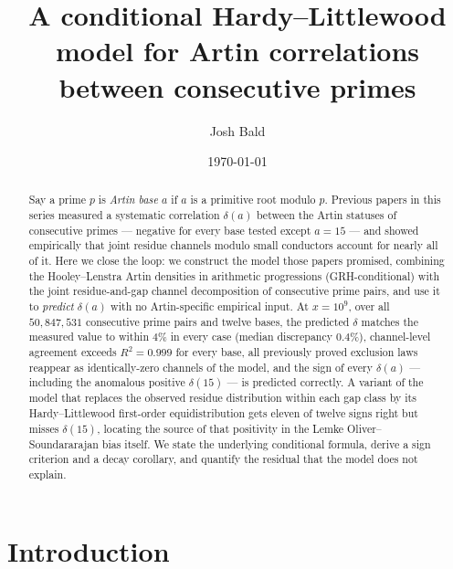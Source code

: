 \documentclass[11pt,reqno]{amsart}
\theoremstyle{plain}
\theoremstyle{definition}
\begin{document}
\title[A conditional model for Artin correlations]
{A conditional Hardy--Littlewood model for Artin correlations between
consecutive primes}

\author{Josh Bald}
\address{Ontario, Canada}


\date{\today}

\begin{abstract}
Say a prime $p$ is \emph{Artin base $a$} if $a$ is a primitive root modulo
$p$. Previous papers in this series measured a systematic correlation
$\delta(a)$ between the Artin statuses of consecutive primes --- negative for
every base tested except $a = 15$ --- and showed empirically that joint
residue channels modulo small conductors account for nearly all of it. Here
we close the loop: we construct the model those papers promised, combining
the Hooley--Lenstra Artin densities in arithmetic progressions
(GRH-conditional) with the joint residue-and-gap channel decomposition of
consecutive prime pairs, and use it to \emph{predict} $\delta(a)$ with no
Artin-specific empirical input. At $x = 10^9$, over all $50{,}847{,}531$
consecutive prime pairs and twelve bases, the predicted $\delta$ matches the
measured value to within $4\%$ in every case (median discrepancy $0.4\%$),
channel-level agreement exceeds $R^2 = 0.999$ for every base, all previously
proved exclusion laws reappear as identically-zero channels of the model, and
the sign of every $\delta(a)$ --- including the anomalous positive
$\delta(15)$ --- is predicted correctly. A variant of the model that replaces
the observed residue distribution within each gap class by its
Hardy--Littlewood first-order equidistribution gets eleven of twelve signs
right but misses $\delta(15)$, locating the source of that positivity in the
Lemke Oliver--Soundararajan bias itself. We state the underlying conditional
formula, derive a sign criterion and a decay corollary, and quantify the
residual that the model does not explain.
\end{abstract}

\maketitle

\section{Introduction}
\end{document}
